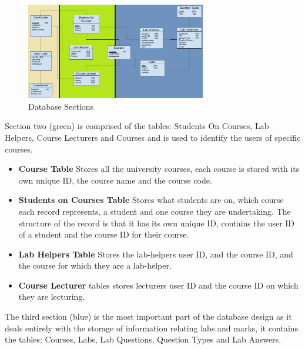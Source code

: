 \documentclass[11pt]{report}
\begin{document}
\begin{figure}[H]
    \centering
    \includegraphics[width=0.7\textwidth]{images/design/DB_Sections.png}
    \caption{Database Sections}
    \label{fig:dbsections}
\end{figure}


\noindent Section two (green) is comprised of the tables: Students On Courses, Lab Helpers, Course Lecturers and Courses and is used to identify the  users of specific courses.
\begin{itemize}
    \item \textbf{Course Table} Stores all the university courses, each course is stored with its own unique ID, the course name and the course code.
    \item \textbf{Students on Courses Table} Stores what students are on, which course each record represents, a student and one course they are undertaking. The structure of the record is that it has its own unique ID, contains the user ID of a student and the course ID for their course. 
    \item \textbf{Lab Helpers Table} Stores the lab-helpers user ID, and the course ID, and the course for which they are a lab-helper.
    \item \textbf{Course Lecturer} tables stores lecturers user ID and the course ID on which they are lecturing.
\end{itemize}



The third section (blue) is the most important part of the database design as it deals entirely with the storage of information relating labs and marks, it contains the tables: Courses, Labs, Lab Questions, Question Types and Lab Answers.
\end{document}
